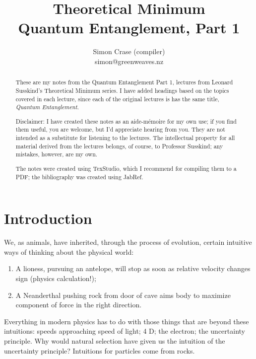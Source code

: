 \documentclass[]{article}
\title{Theoretical Minimum\\Quantum Entanglement, Part 1}
\author{Simon Crase (compiler)\\simon@greenweaves.nz}
\begin{document}
\maketitle

\begin{abstract}
These are my notes from the Quantum Entanglement Part 1, lectures\cite{susskind2013entanglement}  from Leonard Susskind's Theoretical Minimum series\cite{susskind2007theoretical}. I have added headings based on the topics covered in each lecture, since each of the original lectures is has the same title, \emph{Quantum Entanglement}.

Disclaimer: I have created these notes as an aide-m\'emoire for my own use; if you find them useful, you are welcome, but I'd appreciate hearing from you. They are not intended 
as a substitute for listening to the lectures. The intellectual property for all material derived from the lectures belongs, of course, to Professor Susskind; any mistakes, however, are my own.

The notes were created using TexStudio\cite{TexStudio}, which I recommend for compiling them to a PDF; the bibliography was created using JabRef\cite{Jabref}.

\end{abstract}

\tableofcontents
\listoffigures
\listoftables
\listoftheorems


\section{Introduction}


We, as animals, have inherited, through the process of evolution, certain intuitive ways of thinking about the physical world:
\begin{enumerate}
	\item A lioness, pursuing an antelope, will stop as soon as relative velocity changes sign (physics calculation!);
	\item A Neanderthal pushing rock from door of cave aims body to maximize component of force in the right direction.
\end{enumerate}

Everything in modern physics has to do with those things that are beyond these intuitions:
speeds approaching speed of light; 4 D; the electron; the uncertainty principle. Why would natural selection have given us the intuition of the uncertainty principle? Intuitions for particles come from rocks.
\end{document}
